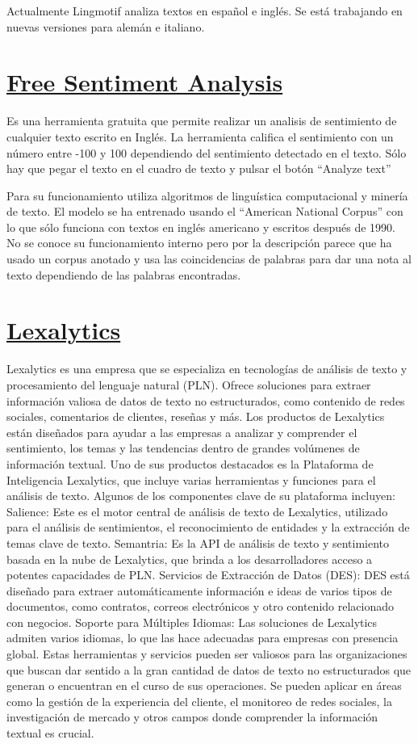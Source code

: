 Actualmente Lingmotif analiza textos en español e inglés. Se está trabajando en nuevas versiones 
para alemán e italiano.

\section{\href{https://www.danielsoper.com/sentimentanalysis/default.aspx}{Free Sentiment Analysis}}
Es una herramienta gratuita que permite realizar un analisis de sentimiento de cualquier 
texto escrito en Inglés. La herramienta califica el sentimiento con un número entre -100 y 100 
dependiendo del sentimiento detectado en el texto.
Sólo hay que pegar el texto en el cuadro de texto y pulsar el botón ``Analyze text''

Para su funcionamiento utiliza algoritmos de linguística computacional y minería de texto.
El modelo se ha entrenado usando el ``American National Corpus'' con lo que sólo funciona con 
textos en inglés americano y escritos después de 1990. 
No se conoce su funcionamiento interno pero por la descripción parece que ha usado un 
corpus anotado y usa las coincidencias de palabras para dar una nota al texto dependiendo 
de las palabras encontradas.

\section{\href{https://www.lexalytics.com/}{Lexalytics}}
Lexalytics es una empresa que se especializa en tecnologías de análisis de texto y 
procesamiento del lenguaje natural (PLN). 
Ofrece soluciones para extraer información valiosa de datos de texto no estructurados, 
como contenido de redes sociales, comentarios de clientes, reseñas y más. 
Los productos de Lexalytics están diseñados para ayudar a las empresas a analizar 
y comprender el sentimiento, los temas y las tendencias dentro de grandes volúmenes de información textual.
Uno de sus productos destacados es la Plataforma de Inteligencia Lexalytics, 
que incluye varias herramientas y funciones para el análisis de texto. 
Algunos de los componentes clave de su plataforma incluyen:
Salience: Este es el motor central de análisis de texto de Lexalytics, utilizado 
para el análisis de sentimientos, el reconocimiento de entidades y la extracción de temas clave de texto.
Semantria: Es la API de análisis de texto y sentimiento basada en la nube de Lexalytics, 
que brinda a los desarrolladores acceso a potentes capacidades de PLN.
Servicios de Extracción de Datos (DES): DES está diseñado para extraer automáticamente 
información e ideas de varios tipos de documentos, como contratos, correos electrónicos y 
otro contenido relacionado con negocios.
Soporte para Múltiples Idiomas: Las soluciones de Lexalytics admiten varios idiomas, 
lo que las hace adecuadas para empresas con presencia global.
Estas herramientas y servicios pueden ser valiosos para las organizaciones que 
buscan dar sentido a la gran cantidad de datos de texto no estructurados que generan o 
encuentran en el curso de sus operaciones. Se pueden aplicar en áreas como la gestión 
de la experiencia del cliente, el monitoreo de redes sociales, la investigación de mercado 
y otros campos donde comprender la información textual es crucial. 

